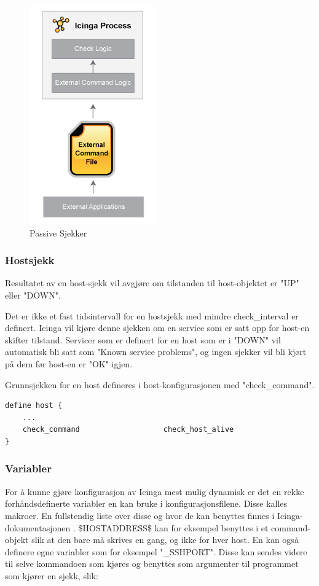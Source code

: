 \begin{figure}[H]
    \centering
    \includegraphics[scale=0.7]{img/passivechecks.png}
    \caption{Passive Sjekker}
    \label{passive_checks}
\end{figure}

\subsubsection{Hostsjekk}
Resultatet av en host-sjekk vil avgjøre om tilstanden til host-objektet er "UP" eller "DOWN". 

Det er ikke et fast tidsintervall for en hostsjekk med mindre check\_interval er definert. Icinga vil kjøre denne sjekken om en service som er satt opp for host-en skifter tilstand. Servicer som er definert for en host som er i "DOWN" vil automatisk bli satt som "Known service problems", og ingen sjekker vil bli kjørt på dem før host-en er "OK" igjen.

Grunnsjekken for en host defineres i host-konfigurasjonen med "check\_command".

\begin{lstlisting}[style=example]
define host {
	...
	check_command                   check_host_alive
}
\end{lstlisting}

\subsubsection{Variabler}
For å kunne gjøre konfigurasjon av Icinga mest mulig dynamisk er det en rekke forhåndsdefinerte variabler en kan bruke i konfigurasjonsfilene. Disse kalles makroer. En fullstendig liste over disse og hvor de kan benyttes finnes i Icinga-dokumentasjonen \cite{icingamacro}. \$HOSTADDRESS\$ kan for eksempel benyttes i et command-objekt slik at den bare må skrives en gang, og ikke for hver host. En kan også definere egne variabler som for eksempel "\_SSHPORT". Disse kan sendes videre til selve kommandoen som kjøres og benyttes som argumenter til programmet som kjører en sjekk, slik:

